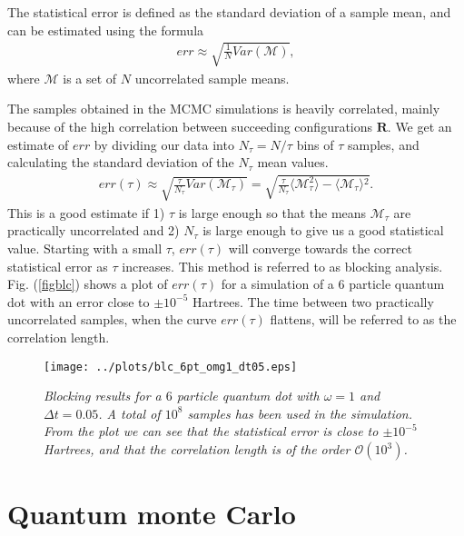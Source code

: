 \documentclass[a4paper,10pt,twocolumn]{article} %
\newcommand{\ts}[1]{\textbf{#1}}
\newcommand{\expec}[1]{\langle{}{#1}\rangle{}}
\begin{document}
The statistical error is defined as the standard deviation of a sample mean, and can be estimated using the formula \cite{m.h-j}
\begin{align}
		err\approx\sqrt{\frac1{N}Var(\mathcal M)},
\end{align}
where $\mathcal M$ is a set of $N$ uncorrelated sample means.  

The samples obtained in the MCMC simulations is heavily correlated, mainly because of the high correlation between succeeding configurations $\ts R$.
We get an estimate of $err$ by dividing our data into $N_\tau=N/\tau$ bins of $\tau$ samples, and calculating the standard deviation of the $N_\tau$ mean values. 
\begin{align}
	err(\tau)\approx\sqrt{\frac\tau{N_\tau}Var(\mathcal M_\tau)} = \sqrt{\frac{\tau}{N_\tau}\expec{\mathcal M_\tau^2}-\expec{\mathcal M_\tau}^2}.
\end{align}
This is a good estimate if 1) $\tau$ is large enough so that the means $\mathcal M_\tau$ are practically uncorrelated and 2) $N_\tau$ is large enough 
to give us a good statistical value. Starting with a small $\tau$, $err(\tau)$ will converge towards the correct statistical error as $\tau$ increases. 
This method is referred to as blocking analysis. Fig. (\ref{figblc}) shows a plot of $err(\tau)$ for a simulation of a $6$ particle quantum dot with an error
close to $\pm10^{-5}$ Hartrees. The time between two practically uncorrelated samples, when the curve $err(\tau)$ flattens, will be referred to as the correlation length.

\begin{figure}[h!]
\begin{center}
\caption{{\it%
		Blocking results for a $6$ particle quantum dot with $\omega=1$ and $\Delta t = 0.05$. A total of $10^8$ samples has been used in the simulation. From the plot we can see that
		the statistical error is close to $\pm10^{-5}$ Hartrees, and that the correlation length is of the order $\mathcal O(10^3)$.}} 
		\label{fig:timesteperror}
	\texttt{[image: ../plots/blc\_6pt\_omg1\_dt05.eps]}
\end{center}
\end{figure}


\section{Quantum monte Carlo}%
\end{document}
